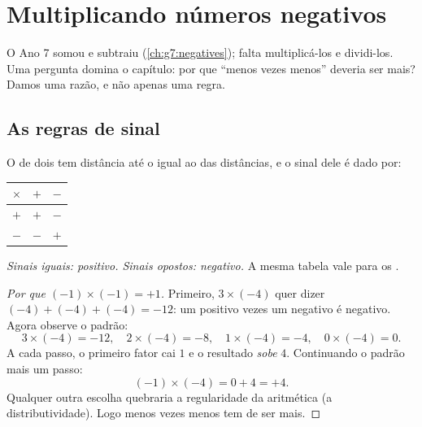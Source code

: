 \chapter{Multiplicando números negativos}\label{ch:g8:negprod}

O Ano 7 somou e subtraiu  (\cref{ch:g7:negatives});
falta multiplicá-los e dividi-los. Uma pergunta domina o capítulo: por
que ``menos vezes menos'' deveria ser mais? Damos uma razão, e não
apenas uma regra.

\section{As regras de sinal}

\begin{theorem}\label{thm:g8:negprod:rules}
O  de dois  tem distância até o  igual ao
 das distâncias, e o sinal dele é dado por:
\begin{center}
\renewcommand{\arraystretch}{1.3}
\begin{tabular}{c|cc}
$\times$ & $+$ & $-$ \\
\hline
$+$ & $+$ & $-$ \\
$-$ & $-$ & $+$ \\
\end{tabular}
\end{center}
\emph{Sinais iguais:  positivo. Sinais opostos: 
negativo.} A mesma tabela vale para os .
\end{theorem}

\begin{proof}[Por que $(-1) \times (-1) = +1$]
Primeiro, $3 \times (-4)$ quer dizer $(-4) + (-4) + (-4) = -12$: um
positivo vezes um negativo é negativo. Agora observe o padrão:
\[
3 \times (-4) = -12, \quad
2 \times (-4) = -8, \quad
1 \times (-4) = -4, \quad
0 \times (-4) = 0 .
\]
A cada passo, o primeiro fator cai $1$ e o resultado \emph{sobe} $4$.
Continuando o padrão mais um passo:
\[
(-1) \times (-4) = 0 + 4 = +4 .
\]
Qualquer outra escolha quebraria a regularidade da aritmética (a
distributividade). Logo menos vezes menos tem de ser mais.
\end{proof}

